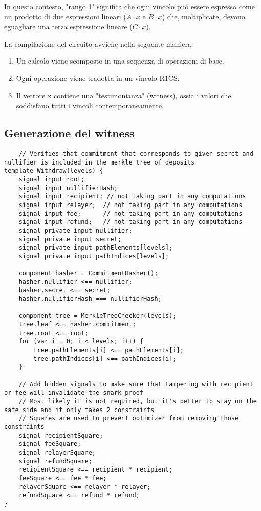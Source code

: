 In questo contesto, "rango 1" significa che ogni vincolo può essere espresso come un prodotto di due espressioni lineari ($A\cdot x$ e $B\cdot x$) che, moltiplicate, devono eguagliare una terza espressione lineare ($C\cdot x$).

La compilazione del circuito avviene nella seguente maniera:

\begin{enumerate}
    \item Un calcolo viene scomposto in una sequenza di operazioni di base.
    \item Ogni operazione viene tradotta in un vincolo R1CS.
    \item Il vettore x contiene una "testimonianza" (witness), ossia i valori che soddisfano tutti i vincoli contemporaneamente.
\end{enumerate}

\subsection{Generazione del witness}

\begin{lstlisting}
    // Verifies that commitment that corresponds to given secret and nullifier is included in the merkle tree of deposits
template Withdraw(levels) {
    signal input root;
    signal input nullifierHash;
    signal input recipient; // not taking part in any computations
    signal input relayer;  // not taking part in any computations
    signal input fee;      // not taking part in any computations
    signal input refund;   // not taking part in any computations
    signal private input nullifier;
    signal private input secret;
    signal private input pathElements[levels];
    signal private input pathIndices[levels];

    component hasher = CommitmentHasher();
    hasher.nullifier <== nullifier;
    hasher.secret <== secret;
    hasher.nullifierHash === nullifierHash;

    component tree = MerkleTreeChecker(levels);
    tree.leaf <== hasher.commitment;
    tree.root <== root;
    for (var i = 0; i < levels; i++) {
        tree.pathElements[i] <== pathElements[i];
        tree.pathIndices[i] <== pathIndices[i];
    }

    // Add hidden signals to make sure that tampering with recipient or fee will invalidate the snark proof
    // Most likely it is not required, but it's better to stay on the safe side and it only takes 2 constraints
    // Squares are used to prevent optimizer from removing those constraints
    signal recipientSquare;
    signal feeSquare;
    signal relayerSquare;
    signal refundSquare;
    recipientSquare <== recipient * recipient;
    feeSquare <== fee * fee;
    relayerSquare <== relayer * relayer;
    refundSquare <== refund * refund;
}
\end{lstlisting}

